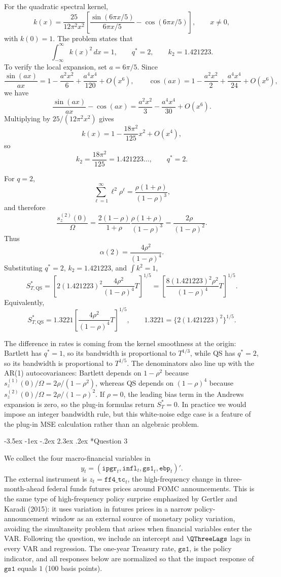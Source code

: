 \documentclass[11pt]{article}
\makeatletter
\renewcommand\section{\@startsection{section}{1}{\z@}%
  {-3.5ex \@plus -1ex \@minus -.2ex}%
  {2.3ex \@plus .2ex}%
  {\normalfont\Large}}
\makeatother
\begin{document}
For the quadratic spectral kernel,
\[
k(x)
=
\frac{25}{12\pi^2x^2}
\left[
\frac{\sin(6\pi x/5)}{6\pi x/5}
-\cos(6\pi x/5)
\right],
\qquad x\neq 0,
\]
with \(k(0)=1\). The problem states that
\[
\int_{-\infty}^{\infty}k(x)^2\,dx=1,
\qquad
q^*=2,
\qquad
k_2=1.421223.
\]
To verify the local expansion, set \(a=6\pi/5\). Since
\[
\frac{\sin(ax)}{ax}=1-\frac{a^2x^2}{6}+\frac{a^4x^4}{120}+O(x^6),
\qquad
\cos(ax)=1-\frac{a^2x^2}{2}+\frac{a^4x^4}{24}+O(x^6),
\]
we have
\[
\frac{\sin(ax)}{ax}-\cos(ax)
=
\frac{a^2x^2}{3}-\frac{a^4x^4}{30}+O(x^6).
\]
Multiplying by \(25/(12\pi^2x^2)\) gives
\[
k(x)=1-\frac{18\pi^2}{125}x^2+O(x^4),
\]
so
\[
k_2=\frac{18\pi^2}{125}=1.421223\ldots,
\qquad q^*=2.
\]

For \(q=2\),
\[
\sum_{\ell=1}^{\infty}\ell^2\rho^\ell
=
\frac{\rho(1+\rho)}{(1-\rho)^3},
\]
and therefore
\[
\frac{s_z^{(2)}(0)}{\Omega}
=
\frac{2(1-\rho)}{1+\rho}
\frac{\rho(1+\rho)}{(1-\rho)^3}
=
\frac{2\rho}{(1-\rho)^2}.
\]
Thus
\[
\alpha(2)=\frac{4\rho^2}{(1-\rho)^4}.
\]
Substituting \(q^*=2\), \(k_2=1.421223\), and \(\int k^2=1\),
\[
S_{T,\mathrm{QS}}^*
=
\left[
2(1.421223)^2
\frac{4\rho^2}{(1-\rho)^4}T
\right]^{1/5}
=
\left[
\frac{8(1.421223)^2\rho^2}{(1-\rho)^4}T
\right]^{1/5}.
\]
Equivalently,
\[
S_{T,\mathrm{QS}}^*
=
1.3221
\left[
\frac{4\rho^2}{(1-\rho)^4}T
\right]^{1/5},
\qquad
1.3221=\{2(1.421223)^2\}^{1/5}.
\]

The difference in rates is coming from the kernel smoothness at the origin:
Bartlett has \(q^*=1\), so its bandwidth is proportional to \(T^{1/3}\), while QS has
\(q^*=2\), so its bandwidth is proportional to \(T^{1/5}\). The denominators also line
up with the AR(1) autocovariances: Bartlett depends on \(1-\rho^2\) because
\(s_z^{(1)}(0)/\Omega=2\rho/(1-\rho^2)\), whereas QS depends on \((1-\rho)^4\)
because \(s_z^{(2)}(0)/\Omega=2\rho/(1-\rho)^2\). If \(\rho=0\), the leading bias
term in the Andrews expansion is zero, so the plug-in formulas return \(S_T^*=0\).
In practice we would impose an integer bandwidth rule, but this white-noise edge case
is a feature of the plug-in MSE calculation rather than an algebraic problem.

\section*{Question 3}

We collect the four macro-financial variables in
\[
y_t=(\texttt{ipgr}_t,\texttt{infl}_t,\texttt{gs1}_t,\texttt{ebp}_t)'.
\]
The external instrument is \(z_t=\texttt{ff4\_tc}_t\),
the high-frequency change in three-month-ahead federal funds futures prices around
FOMC announcements. This is the same type of high-frequency policy surprise emphasized
by Gertler and Karadi (2015): it uses variation in futures
prices in a narrow policy-announcement window as an external source of monetary policy
variation, avoiding the simultaneity problem that arises when financial variables enter
the VAR. Following the question, we include an intercept and \(\QThreeLags\) lags in
every VAR and regression. The one-year Treasury rate, \(\texttt{gs1}\), is the policy
indicator, and all responses below are normalized so that the impact response of
\(\texttt{gs1}\) equals \(1\) (100 basis points).
\end{document}
